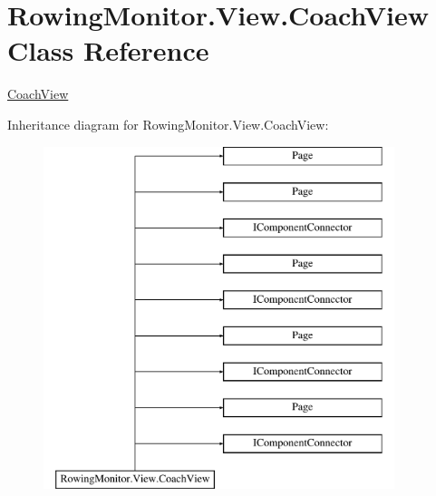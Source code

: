 \hypertarget{class_rowing_monitor_1_1_view_1_1_coach_view}{}\section{Rowing\+Monitor.\+View.\+Coach\+View Class Reference}
\label{class_rowing_monitor_1_1_view_1_1_coach_view}


\hyperlink{class_rowing_monitor_1_1_view_1_1_coach_view}{Coach\+View}  


Inheritance diagram for Rowing\+Monitor.\+View.\+Coach\+View\+:\begin{figure}[H]
\begin{center}
\leavevmode
\includegraphics[height=10.000000cm]{class_rowing_monitor_1_1_view_1_1_coach_view}
\end{center}
\end{figure}
